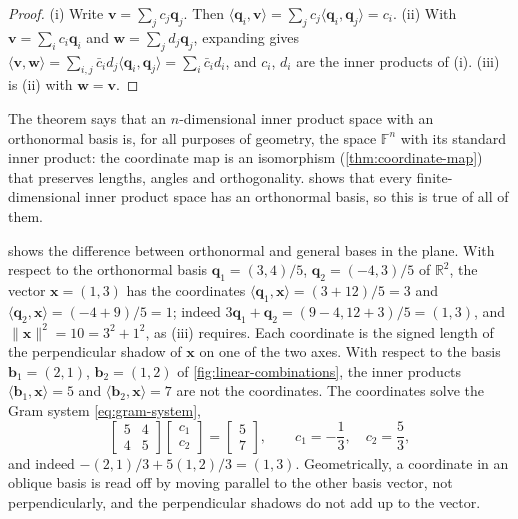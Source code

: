 \begin{proof}
(i) Write $\mathbf v=\sum_jc_j\mathbf q_j$. Then $\langle\mathbf q_i,\mathbf v\rangle=\sum_jc_j\langle\mathbf q_i,\mathbf q_j\rangle=c_i$. (ii) With $\mathbf v=\sum_ic_i\mathbf q_i$ and $\mathbf w=\sum_jd_j\mathbf q_j$, expanding gives $\langle\mathbf v,\mathbf w\rangle=\sum_{i,j}\bar c_id_j\langle\mathbf q_i,\mathbf q_j\rangle=\sum_i\bar c_id_i$, and $c_i$, $d_i$ are the inner products of (i). (iii) is (ii) with $\mathbf w=\mathbf v$.
\end{proof}

The theorem says that an $n$-dimensional inner product space with an orthonormal basis is, for all purposes of geometry, the space $\mathbb F^n$ with its standard inner product: the coordinate map is an isomorphism (\cref{thm:coordinate-map}) that preserves lengths, angles and orthogonality.  shows that every finite-dimensional inner product space has an orthonormal basis, so this is true of all of them.

 shows the difference between orthonormal and general bases in the plane. With respect to the orthonormal basis $\mathbf q_1=(3,4)/5$, $\mathbf q_2=(-4,3)/5$ of $\mathbb R^2$, the vector $\mathbf x=(1,3)$ has the coordinates $\langle\mathbf q_1,\mathbf x\rangle=(3+12)/5=3$ and $\langle\mathbf q_2,\mathbf x\rangle=(-4+9)/5=1$; indeed $3\mathbf q_1+\mathbf q_2=(9-4,12+3)/5=(1,3)$, and $\|\mathbf x\|^2=10=3^2+1^2$, as (iii) requires. Each coordinate is the signed length of the perpendicular shadow of $\mathbf x$ on one of the two axes. With respect to the basis $\mathbf b_1=(2,1)$, $\mathbf b_2=(1,2)$ of \cref{fig:linear-combinations}, the inner products $\langle\mathbf b_1,\mathbf x\rangle=5$ and $\langle\mathbf b_2,\mathbf x\rangle=7$ are not the coordinates. The coordinates solve the Gram system \eqref{eq:gram-system},
\[
\begin{bmatrix}5&4\\4&5\end{bmatrix}\begin{bmatrix}c_1\\c_2\end{bmatrix}=\begin{bmatrix}5\\7\end{bmatrix},\qquad c_1=-\frac13,\quad c_2=\frac53,
\]
and indeed $-(2,1)/3+5(1,2)/3=(1,3)$. Geometrically, a coordinate in an oblique basis is read off by moving parallel to the other basis vector, not perpendicularly, and the perpendicular shadows do not add up to the vector.

